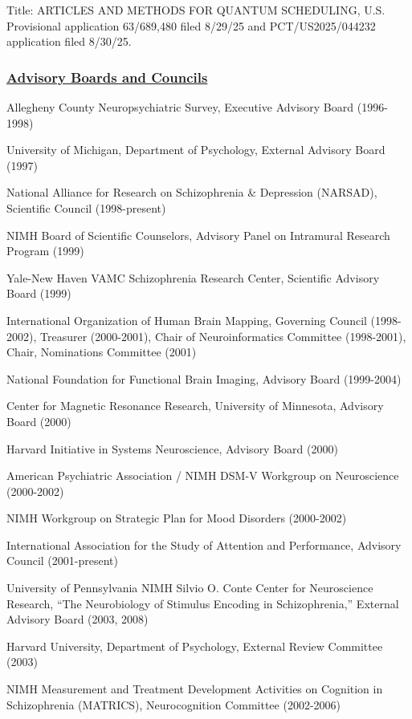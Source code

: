 \documentclass[10 pt]{article}
\begin{document}
Title: ARTICLES AND METHODS FOR QUANTUM SCHEDULING, U.S. Provisional application 63/689,480 filed 8/29/25 and PCT/US2025/044232 application filed 8/30/25.


\subsubsection*{\underline{Advisory Boards and Councils}} \label{secABaC}
    \smallskip

Allegheny County Neuropsychiatric Survey, Executive Advisory Board (1996-1998)

University of Michigan, Department of Psychology, External Advisory Board (1997)

National Alliance for Research on Schizophrenia \& Depression (NARSAD), Scientific Council (1998-present)

NIMH Board of Scientific Counselors, Advisory Panel on Intramural Research Program (1999)

Yale-New Haven VAMC Schizophrenia Research Center, Scientific Advisory Board (1999)

International Organization of Human Brain Mapping, Governing Council (1998-2002), Treasurer (2000-2001), Chair of Neuroinformatics Committee (1998-2001), Chair, Nominations Committee (2001)

National Foundation for Functional Brain Imaging, Advisory Board (1999-2004)

Center for Magnetic Resonance Research, University of Minnesota, Advisory Board (2000)

Harvard Initiative in Systems Neuroscience, Advisory Board (2000)

American Psychiatric Association / NIMH DSM-V Workgroup on Neuroscience (2000-2002)

NIMH Workgroup on Strategic Plan for Mood Disorders (2000-2002)

International Association for the Study of Attention and Performance, Advisory Council (2001-present)

University of Pennsylvania NIMH Silvio O. Conte Center for Neuroscience Research, “The Neurobiology of Stimulus Encoding in Schizophrenia,” External Advisory Board (2003, 2008)

Harvard University, Department of Psychology, External Review Committee (2003)

NIMH Measurement and Treatment Development Activities on Cognition in Schizophrenia (MATRICS), Neurocognition Committee (2002-2006)
\end{document}
